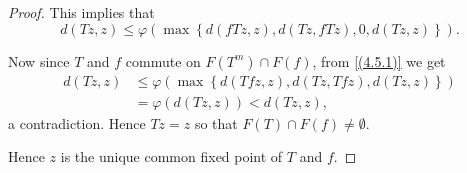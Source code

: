 \documentclass[a4paper,12pt,oneside]{article}
\numberwithin{equation}{section}
\begin{document}
\begin{proof}
This implies that
\begin{equation}
d(Tz, z) \leq \varphi\left(\max\left\{d(fTz, z), d(Tz, fTz), 0, d(Tz, z)\right\}\right).
\end{equation}

Now since \(T\) and \(f\) commute on \(F(T^{m}) \cap F(f)\), from \eqref{(4.5.1)} we get
\begin{align*}
d(Tz, z) &\leq \varphi\left(\max\left\{d(Tfz, z), d(Tz, Tfz),  d(Tz, z)\right\}\right) \\
&= \varphi(d(Tz, z)) < d(Tz, z),
\end{align*}
a contradiction. Hence \(Tz = z\) so that \(F(T) \cap F(f) \neq \emptyset\).

Hence \(z\) is the unique common fixed point of \(T\) and \(f\).
\end{proof}
\end{document}
